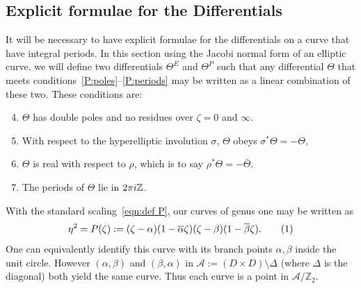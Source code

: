 \documentclass{article}
\begin{document}
\subsection{Explicit formulae for the Differentials}
\label{sec:Differentials}
It will be necessary to have explicit formulae for the differentials on a curve that have integral periods. In this section using the Jacobi normal form of an elliptic curve. we will define two differentials $\Theta^E$ and $\Theta^P$ such that any differential $\Theta$ that meets conditions~\ref{P:poles}--\ref{P:periods} may be written as a linear combination of these two.
These conditions are:
\begin{enumerate}[label=(P.\arabic*)]
\setcounter{enumi}{3}
\item
$\Theta$ has double poles and no residues over $\zeta=0$ and $\infty$.
\item
With respect to the hyperelliptic involution $\sigma$, $\Theta$ obeys $\sigma^*\Theta = - \Theta$,
\item
$\Theta$ is real with respect to $\rho$, which is to say $\rho^* \Theta = - \bar{\Theta}$.
\item
The periods of $\Theta$ lie in $2\pi i\mathbb{Z}$.
\end{enumerate}

With the standard scaling~\eqref{eqn:def P}, our curves of genus one may be written as
\[
\eta^2 = P(\zeta) := (\zeta-\alpha)(1-\bar{\alpha}\zeta)(\zeta-\beta)(1-\bar{\beta}\zeta).
\labelthis{eqn:genus one curve}
\]
One can equivalently identify this curve with its branch points $\alpha,\beta$ inside the unit circle. However $(\alpha, \beta)$ and $(\beta,\alpha)$ in $\mathcal{A} := (D \times D) \setminus \Delta$ (where $\Delta$ is the diagonal) both yield the same curve. Thus each curve is a point in $\mathcal{A}/\mathbb{Z}_2$. 
\end{document}
